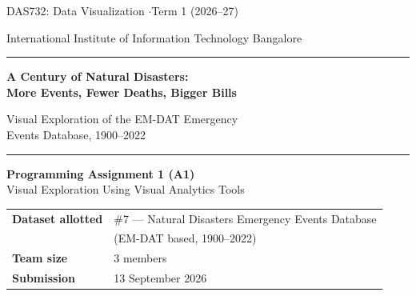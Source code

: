 \documentclass[11pt,a4paper]{article}
\begin{document}

\begin{titlepage}
\thispagestyle{empty}
\raggedright
\vspace*{0.4cm}

{\color{inkmuted}\sffamily\large DAS732: Data Visualization \quad$\cdot$\quad Term 1 (2026--27)\par}
{\color{inkmuted}\sffamily\large International Institute of Information Technology Bangalore\par}

\vspace{0.75cm}
{\color{rulegrey}\rule{\linewidth}{1.2pt}}
\vspace{0.65cm}

{\sffamily\bfseries\fontsize{24}{29}\selectfont
A Century of Natural Disasters:\\[0.22em]
More Events, Fewer Deaths, Bigger Bills\par}

\vspace{0.5cm}
{\sffamily\Large\color{inkgrey}
Visual Exploration of the EM-DAT Emergency\\Events Database, 1900--2022\par}

\vspace{0.55cm}
{\color{rulegrey}\rule{\linewidth}{1.2pt}}
\vspace{0.65cm}

{\sffamily\large\textbf{Programming Assignment 1 (A1)}\\[0.25em]
{\color{inkgrey}Visual Exploration Using Visual Analytics Tools}\par}

\vspace{0.6cm}

{\sffamily
\begin{tabular}{@{}ll@{}}
\textbf{Dataset allotted} & \#7 --- Natural Disasters Emergency Events Database\\
                          & (EM-DAT based, 1900--2022)\\[0.3em]
\textbf{Team size}        & 3 members\\[0.3em]
\textbf{Submission}       & 13 September 2026\\
\end{tabular}\par}


\end{titlepage}
\end{document}
